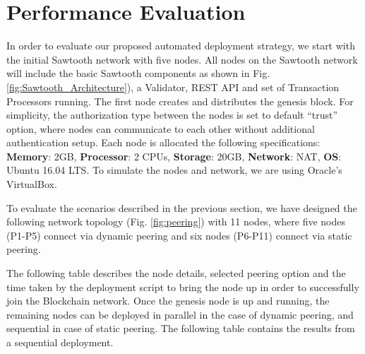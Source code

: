 \section{Performance Evaluation}
\label{sec:Evaluation}
In order to evaluate our proposed automated deployment strategy, we start with the initial Sawtooth network with five nodes. All nodes on the Sawtooth network will include the basic Sawtooth components as shown in Fig. \ref{fig:Sawtooth_Architecture}), a Validator, REST API and set of Transaction Processors running. The first node creates and distributes the genesis block. For simplicity, the authorization type between the nodes is set to default ``trust'' option, where nodes can communicate to each other without additional authentication setup. Each node is allocated the following specifications: \textbf{Memory}: 2GB, \textbf{Processor}: 2 CPUs, \textbf{Storage}: 20GB, \textbf{Network}: NAT, \textbf{OS}: Ubuntu 16.04 LTS. To simulate the nodes and network, we are using Oracle's VirtualBox\cite{oracle-virtualbox}. 

To evaluate the scenarios described in the previous section, we have designed the following network topology (Fig. \ref{fig:peering}) with 11 nodes, where five nodes (P1-P5) connect via dynamic peering and six nodes (P6-P11) connect via static peering.

The following table describes the node details, selected peering option and the time taken by the deployment script to bring the node up in order to successfully join the Blockchain network. Once the genesis node is up and running, the remaining nodes can be deployed in parallel in the case of dynamic peering, and sequential in case of static peering. The following table contains the results from a sequential deployment. 

